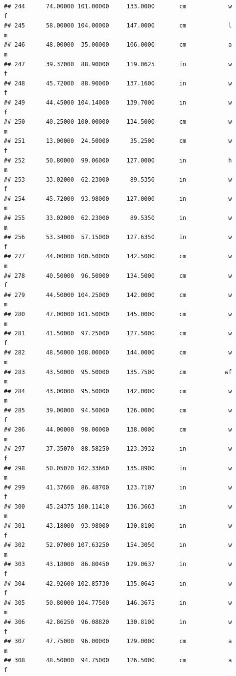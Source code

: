 \documentclass[]{article}
\begin{document}
\begin{verbatim}
## 244      74.00000 101.00000     133.0000       cm            w         f
## 245      58.00000 104.00000     147.0000       cm            l         m
## 246      48.00000  35.00000     106.0000       cm            a         m
## 247      39.37000  88.90000     119.0625       in            w         f
## 248      45.72000  88.90000     137.1600       in            w         f
## 249      44.45000 104.14000     139.7000       in            w         f
## 250      40.25000 100.00000     134.5000       cm            w         m
## 251      13.00000  24.50000      35.2500       cm            w         f
## 252      50.80000  99.06000     127.0000       in            h         m
## 253      33.02000  62.23000      89.5350       in            w         f
## 254      45.72000  93.98000     127.0000       in            w         m
## 255      33.02000  62.23000      89.5350       in            w         m
## 256      53.34000  57.15000     127.6350       in            w         f
## 277      44.00000 100.50000     142.5000       cm            w         m
## 278      40.50000  96.50000     134.5000       cm            w         f
## 279      44.50000 104.25000     142.0000       cm            w         m
## 280      47.00000 101.50000     145.0000       cm            w         m
## 281      41.50000  97.25000     127.5000       cm            w         f
## 282      48.50000 108.00000     144.0000       cm            w         m
## 283      43.50000  95.50000     135.7500       cm           wf         m
## 284      43.00000  95.50000     142.0000       cm            w         m
## 285      39.00000  94.50000     126.0000       cm            w         f
## 286      44.00000  98.00000     138.0000       cm            w         m
## 297      37.35070  88.58250     123.3932       in            w         f
## 298      50.05070 102.33660     135.8900       in            w         m
## 299      41.37660  86.48700     123.7107       in            w         f
## 300      45.24375 100.11410     136.3663       in            w         m
## 301      43.18000  93.98000     130.8100       in            w         f
## 302      52.07000 107.63250     154.3050       in            w         m
## 303      43.18000  86.80450     129.0637       in            w         f
## 304      42.92600 102.85730     135.0645       in            w         f
## 305      50.80000 104.77500     146.3675       in            w         m
## 306      42.86250  96.08820     130.8100       in            w         f
## 307      47.75000  96.00000     129.0000       cm            a         m
## 308      48.50000  94.75000     126.5000       cm            a         f

\end{verbatim}
\end{document}
